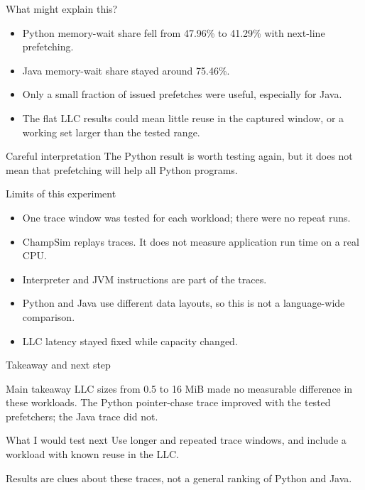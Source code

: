 \documentclass[aspectratio=169]{beamer}
\begin{document}
\begin{frame}{What might explain this?}
  \begin{itemize}
    \item Python memory-wait share fell from 47.96\% to 41.29\% with next-line
          prefetching.
    \item Java memory-wait share stayed around 75.46\%.
    \item Only a small fraction of issued prefetches were useful, especially
          for Java.
    \item The flat LLC results could mean little reuse in the captured window,
          or a working set larger than the tested range.
  \end{itemize}

  \begin{alertblock}{Careful interpretation}
    The Python result is worth testing again, but it does not mean that
    prefetching will help all Python programs.
  \end{alertblock}
\end{frame}

\begin{frame}{Limits of this experiment}
  \begin{itemize}
    \item One trace window was tested for each workload; there were no repeat runs.
    \item ChampSim replays traces. It does not measure application run time on
          a real CPU.
    \item Interpreter and JVM instructions are part of the traces.
    \item Python and Java use different data layouts, so this is not a
          language-wide comparison.
    \item LLC latency stayed fixed while capacity changed.
  \end{itemize}
\end{frame}

\begin{frame}{Takeaway and next step}
  \begin{block}{Main takeaway}
    LLC sizes from 0.5 to 16 MiB made no measurable difference in these
    workloads. The Python pointer-chase trace improved with the tested
    prefetchers; the Java trace did not.
  \end{block}

  \begin{block}{What I would test next}
    Use longer and repeated trace windows, and include a workload with known
    reuse in the LLC.
  \end{block}

  \vfill
  \centering
  \small Results are clues about these traces, not a general ranking of Python
  and Java.
\end{frame}
\end{document}
